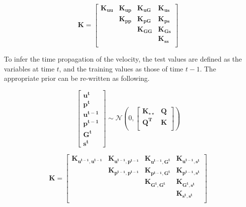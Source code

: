 \documentclass[11pt, a4paper]{report}
\begin{document}
\begin{equation}
    \boldsymbol{K} = 
    \begin{bmatrix}
        \boldsymbol{K_{u u}} &\boldsymbol{K_{u p}}& \boldsymbol{K_{u G}}& \boldsymbol{K_{u s}} \\
        \ & \boldsymbol{K_{p p}}& \boldsymbol{K_{p G}}& \boldsymbol{K_{p s}} \\
        \ & & \boldsymbol{K_{G G}} & \boldsymbol{K_{G s}} \\
        \ & & & \boldsymbol{K_{s s}} \\
    \end{bmatrix}
\end{equation}

To infer the time propagation of the velocity, the test values are defined as the variables at time \(t\), and the training values as those of time \(t-1\).
The appropriate prior can be re-written as following.

\begin{equation}
    \begin{bmatrix}
        \boldsymbol{u^{t}} \\
        \boldsymbol{p^{t}} \\
        \boldsymbol{u^{t-1}}\\
        \boldsymbol{p^{t-1}} \\
        \boldsymbol{G^{t}} \\
        \boldsymbol{s^{t}}
    \end{bmatrix}
    \sim\mathcal{N}\left(0,
    \begin{bmatrix}
         \boldsymbol{K_{\star \star}} & \boldsymbol{Q}\\
        \boldsymbol{Q^T} & \boldsymbol{K} \\
    \end{bmatrix}
    \right)
    \label{eq:joint-generic}
\end{equation}

\begin{equation}
    \boldsymbol{K} = 
    \begin{bmatrix}
        \boldsymbol{K_{u^{t-1}, u^{t-1}}} &\boldsymbol{K_{u^{t-1}, p^{t-1}}}& \boldsymbol{K_{u^{t-1}, G^t}}& \boldsymbol{K_{u^{t-1}, s^t}} \\
        \ & \boldsymbol{K_{p^{t-1}, p^{t-1}}}& \boldsymbol{K_{p^{t-1}, G^t}}& \boldsymbol{K_{p^{t-1}, s^t}} \\
        \ & & \boldsymbol{K_{G^t, G^t}} & \boldsymbol{K_{G^t, s^t}} \\
        \ & & & \boldsymbol{K_{s^t, s^t}} \\
    \end{bmatrix}
    \label{eq:Ktrain-generic}
\end{equation}
\end{document}
